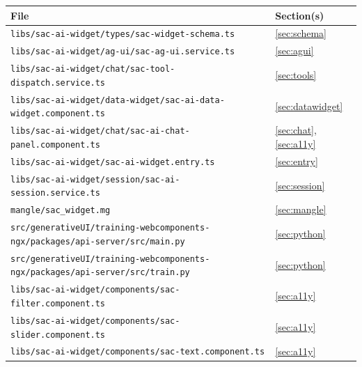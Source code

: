 \documentclass[11pt]{article}
\begin{document}
\begin{longtable}{p{}p{}}
\toprule
\textbf{File} & \textbf{Section(s)} \\
\midrule
\texttt{libs/sac-ai-widget/types/sac-widget-schema.ts} & \ref{sec:schema} \\
\texttt{libs/sac-ai-widget/ag-ui/sac-ag-ui.service.ts} & \ref{sec:agui} \\
\texttt{libs/sac-ai-widget/chat/sac-tool-dispatch.service.ts} & \ref{sec:tools} \\
\texttt{libs/sac-ai-widget/data-widget/sac-ai-data-widget.component.ts} & \ref{sec:datawidget} \\
\texttt{libs/sac-ai-widget/chat/sac-ai-chat-panel.component.ts} & \ref{sec:chat}, \ref{sec:a11y} \\
\texttt{libs/sac-ai-widget/sac-ai-widget.entry.ts} & \ref{sec:entry} \\
\texttt{libs/sac-ai-widget/session/sac-ai-session.service.ts} & \ref{sec:session} \\
\texttt{mangle/sac\_widget.mg} & \ref{sec:mangle} \\
\texttt{src/generativeUI/training-webcomponents-ngx/packages/api-server/src/main.py} & \ref{sec:python} \\
\texttt{src/generativeUI/training-webcomponents-ngx/packages/api-server/src/train.py} & \ref{sec:python} \\
\texttt{libs/sac-ai-widget/components/sac-filter.component.ts} & \ref{sec:a11y} \\
\texttt{libs/sac-ai-widget/components/sac-slider.component.ts} & \ref{sec:a11y} \\
\texttt{libs/sac-ai-widget/components/sac-text.component.ts} & \ref{sec:a11y} \\
\bottomrule
\end{longtable}
\end{document}
